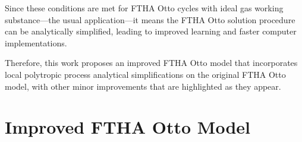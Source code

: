    Since these conditions are met for FTHA Otto cycles with ideal gas working substance---the usual application---it means  the
    FTHA  Otto  solution  procedure  can  be  analytically  simplified,  leading  to  improved  learning  and  faster   computer
    implementations.

    Therefore, this  work  proposes  an  improved  FTHA  Otto  model  that  incorporates  local  polytropic  process  analytical
    simplifications on the original FTHA Otto model, with other minor improvements that are highlighted as they appear.



\section{Improved FTHA Otto Model}



